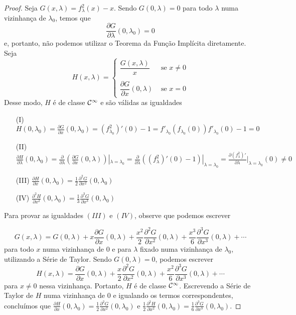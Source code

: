 \begin{proof}
Seja $G(x, \lambda) = f^2_\lambda (x) - x$. Sendo $G(0, \lambda) = 0$ para todo $\lambda$ numa vizinhança de $\lambda_0$, temos que
$$\frac{\partial G}{\partial \lambda}(0, \lambda_0) = 0$$
e, portanto, não podemos utilizar o Teorema da Função Implícita diretamente.
Seja
\[ H(x, \lambda) =
    \begin{cases} 
      \dfrac{G(x, \lambda)}{x} & \textrm{ se } x \neq 0 \\
      \\
      \dfrac{\partial G}{\partial x}(0, \lambda) & \textrm{ se } x = 0
   \end{cases}
\]
Desse modo, $H$ é de classe $\mathcal{C}^\infty$ e são válidas as igualdades
\begin{enumerate}
\item[(I)]
$H(0, \lambda_0) = \frac{\partial G}{\partial x}(0, \lambda_0) = (f^2_{\lambda_0})'(0) - 1 = f'_{\lambda_0}(f_{\lambda_0}(0)) f'_{\lambda_0}(0) - 1 = 0 $

\item[(II)]
$\frac{\partial H}{\partial \lambda}(0, \lambda_0) = \frac{\partial}{\partial \lambda} \left( \frac{\partial G}{\partial x}(0, \lambda) \right) |_{\lambda = \lambda_0} = \frac{\partial}{\partial \lambda}((f^2_\lambda)'(0) - 1)|_{\lambda = \lambda_0} = \frac{\partial (f^2_\lambda)'}{\partial \lambda}|_{\lambda = \lambda_0}(0) \neq 0$
 
\item[(III)]
$ \frac{\partial H}{\partial x}(0, \lambda_0) = \frac{1}{2}\frac{\partial^2 G}{\partial x^2}(0, \lambda_0) $
\item[(IV)]
$\frac{\partial^2 H}{\partial x^2}(0, \lambda_0) = \frac{1}{3} \frac{\partial^3 
G}{\partial x^3}(0, \lambda_0)$
\end{enumerate}

Para provar as igualdades $(III)$ e $(IV)$, observe que podemos escrever

$$G(x,  \lambda) = G(0, \lambda) + x \frac{\partial G}{\partial x}(0, \lambda) + \frac{x^2}{2} \frac{\partial ^2 G}{\partial x^2} (0, \lambda) + \frac{x^3}{6} \frac{\partial ^3 G}{\partial x^3} (0, \lambda) + \cdots$$
para todo $x$ numa vizinhança de $0$ e para $\lambda$ fixado numa vizinhança de $\lambda_0$, utilizando a Série de Taylor. Sendo $G(0, \lambda) = 0$, podemos escrever
$$ H(x, \lambda)
= \frac{\partial G}{\partial x}(0, \lambda)
+ \frac{x}{2} \frac{\partial ^2 G}{\partial x^2} (0, \lambda)
+ \frac{x^2}{6} \frac{\partial ^3 G}{\partial x^3} (0, \lambda)
+ \cdots$$
para $x \neq 0$ nessa vizinhança. Portanto, $H$ é de classe $\mathcal{C}^\infty$. Escrevendo a Série de Taylor de $H$ numa vizinhança de $0$ e igualando os termos correspondentes, concluímos que $\frac{\partial H}{\partial x}(0, \lambda_0) = \frac{1}{2} \frac{\partial ^2 G}{\partial x^2} (0, \lambda_0)$ e $\frac{1}{2} \frac{\partial ^2 H}{\partial x^2} (0, \lambda_0) = \frac{1}{6} \frac{\partial ^3 G}{\partial x^3} (0, \lambda_0)$.


\end{proof}
